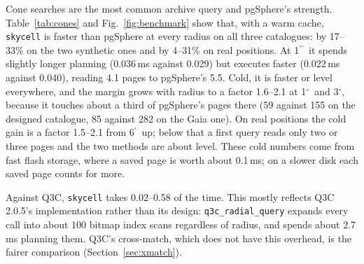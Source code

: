 \documentclass[preprint,12pt]{elsarticle}
\newcommand{\arcsec}{\ensuremath{^{\prime\prime}}}
\newcommand{\arcmin}{\ensuremath{^{\prime}}}
\newcommand{\degr}{\ensuremath{^{\circ}}}
\newcommand{\Sect}{Section}
\begin{document}
Cone searches are the most common archive query and pgSphere's strength.
Table~\ref{tab:cones} and Fig.~\ref{fig:benchmark} show that, with a warm cache,
\texttt{skycell} is faster than pgSphere at every radius on all three catalogues: by
17--33\% on the two synthetic ones and by 4--31\% on real positions. At 1\arcsec\ it
spends slightly longer planning (0.036\,ms against 0.029) but executes faster (0.022\,ms
against 0.040), reading 4.1 pages to pgSphere's 5.5. Cold, it
is faster or level everywhere, and the margin grows with radius to a factor 1.6--2.1 at
1\degr\ and 3\degr, because it touches about a third of pgSphere's pages there (59
against 155 on the designed catalogue, 85 against 282 on the Gaia one). On real
positions the cold gain is a factor 1.5--2.1 from 6\arcmin\ up; below that a first query
reads only two or three pages and the two methods are about level. These cold numbers
come from fast flash storage, where a saved page is worth about 0.1\,ms; on a slower disk
each saved page counts for more.

Against Q3C, \texttt{skycell} takes 0.02--0.58 of the time. This mostly reflects Q3C
2.0.5's implementation rather than its design: \texttt{q3c\_radial\_query} expands every
call into about 100 bitmap index scans regardless of radius, and spends about 2.7\,ms
planning them. Q3C's cross-match, which does not have this overhead, is the fairer
comparison (\Sect~\ref{sec:xmatch}).
\end{document}
